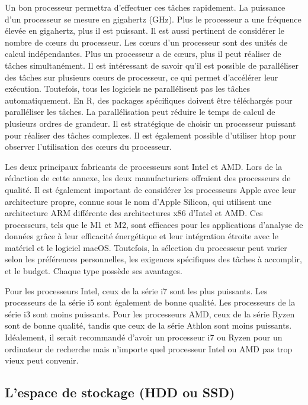 \documentclass[
  letterpaper,
  DIV=11,
  numbers=noendperiod,
  oneside]{scrreprt}
\begin{document}
Un bon processeur permettra d'effectuer ces tâches rapidement. La
puissance d'un processeur se mesure en gigahertz (GHz). Plus le
processeur a une fréquence élevée en gigahertz, plus il est puissant. Il
est aussi pertinent de considérer le nombre de cœurs du processeur. Les
cœurs d'un processeur sont des unités de calcul indépendantes. Plus un
processeur a de cœurs, plus il peut réaliser de tâches simultanément. Il
est intéressant de savoir qu'il est possible de paralléliser des tâches
sur plusieurs cœurs de processeur, ce qui permet d'accélérer leur
exécution. Toutefois, tous les logiciels ne parallélisent pas les tâches
automatiquement. En R, des packages spécifiques doivent être téléchargés
pour paralléliser les tâches. La parallélisation peut réduire le temps
de calcul de plusieurs ordres de grandeur. Il est stratégique de choisir
un processeur puissant pour réaliser des tâches complexes. Il est
également possible d'utiliser htop pour observer l'utilisation des cœurs
du processeur.

Les deux principaux fabricants de processeurs sont Intel et AMD. Lors de
la rédaction de cette annexe, les deux manufacturiers offraient des
processeurs de qualité. Il est également important de considérer les
processeurs Apple avec leur architecture propre, connue sous le nom
d'Apple Silicon, qui utilisent une architecture ARM différente des
architectures x86 d'Intel et AMD. Ces processeurs, tels que le M1 et M2,
sont efficaces pour les applications d'analyse de données grâce à leur
efficacité énergétique et leur intégration étroite avec le matériel et
le logiciel macOS. Toutefois, la sélection du processeur peut varier
selon les préférences personnelles, les exigences spécifiques des tâches
à accomplir, et le budget. Chaque type possède ses avantages.

Pour les processeurs Intel, ceux de la série i7 sont les plus puissants.
Les processeurs de la série i5 sont également de bonne qualité. Les
processeurs de la série i3 sont moins puissants. Pour les processeurs
AMD, ceux de la série Ryzen sont de bonne qualité, tandis que ceux de la
série Athlon sont moins puissants. Idéalement, il serait recommandé
d'avoir un processeur i7 ou Ryzen pour un ordinateur de recherche mais
n'importe quel processeur Intel ou AMD pas trop vieux peut convenir.

\hypertarget{lespace-de-stockage-hdd-ou-ssd}{%
\subsection{L'espace de stockage (HDD ou
SSD)}\label{lespace-de-stockage-hdd-ou-ssd}}
\end{document}
